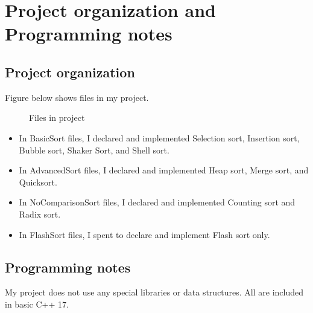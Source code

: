 \documentclass[12pt,a4paper]{article}
\begin{document}
\section{Project organization and Programming notes}
\subsection{Project organization}
Figure below shows files in my project. 

\begin{center}
\begin{figure}[H]
\label{files}
\caption{Files in project}
\end{figure}
\end{center}
\begin{itemize}
\item In BasicSort files, I declared and implemented Selection sort, Insertion sort, Bubble sort, Shaker Sort, and Shell sort.
\item In AdvancedSort files, I declared and implemented Heap sort, Merge sort, and Quicksort.
\item In NoComparisonSort files, I declared and implemented Counting sort and Radix sort.
\item In FlashSort files, I spent to declare and implement Flash sort only.
\end{itemize}
\subsection{Programming notes}
My project does not use any special libraries or data structures. All are included in basic C++ 17.
\end{document}
